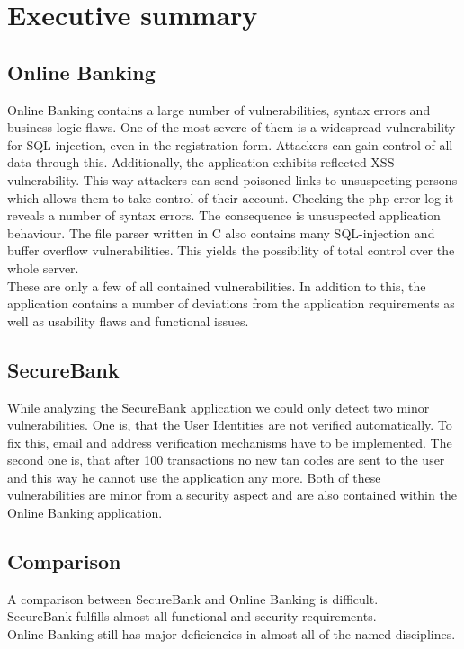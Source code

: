 \chapter{Executive summary}
\section*{Online Banking}
Online Banking contains a large number of vulnerabilities, syntax errors and business logic flaws.
One of the most severe of them is a widespread vulnerability for SQL-injection, even in the registration form. Attackers can gain control of all data through this.
Additionally, the application exhibits reflected XSS vulnerability. This way attackers can send poisoned links to unsuspecting persons which allows them to take control of their account.
Checking the php error log it reveals a number of syntax errors. The consequence is unsuspected application behaviour.
The file parser written in C also contains many SQL-injection and buffer overflow vulnerabilities. This yields the possibility of total control over the whole server.\\
These are only a few of all contained vulnerabilities.
In addition to this, the application contains a number of deviations from the application requirements as well as usability flaws and functional issues.


\section*{SecureBank}
While analyzing the SecureBank application we could only detect two minor vulnerabilities.
One is, that the User Identities are not verified automatically. To fix this, email and address verification mechanisms have to be implemented.
The second one is, that after 100 transactions no new tan codes are sent to the user and this way he cannot use the application any more.
Both of these vulnerabilities are minor from a security aspect and are also contained within the Online Banking application.

\section*{Comparison}
A comparison between SecureBank and Online Banking is difficult.\\
SecureBank fulfills almost all functional and security requirements.\\
Online Banking still has major deficiencies in almost all of the named disciplines.
